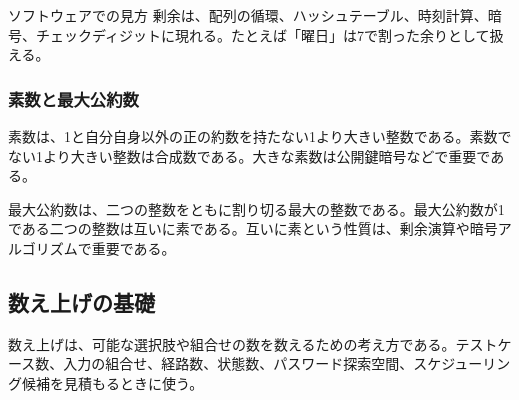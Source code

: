 \documentclass[a4paper,11pt]{ltjsarticle}
\numberwithin{figure}{section}
\numberwithin{table}{section}
\begin{document}
\begin{notebox}{ソフトウェアでの見方}
剰余は、配列の循環、ハッシュテーブル、時刻計算、暗号、チェックディジットに現れる。たとえば「曜日」は7で割った余りとして扱える。
\end{notebox}
\subsubsection{素数と最大公約数}
素数は、1と自分自身以外の正の約数を持たない1より大きい整数である。素数でない1より大きい整数は合成数である。大きな素数は公開鍵暗号などで重要である。

最大公約数は、二つの整数をともに割り切る最大の整数である。最大公約数が1である二つの整数は互いに素である。互いに素という性質は、剰余演算や暗号アルゴリズムで重要である。

\subsection{数え上げの基礎}
数え上げは、可能な選択肢や組合せの数を数えるための考え方である。テストケース数、入力の組合せ、経路数、状態数、パスワード探索空間、スケジューリング候補を見積もるときに使う。
\end{document}
